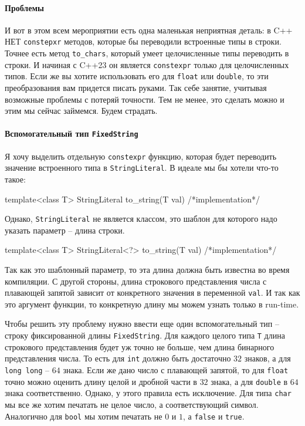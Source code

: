 \paragraph{Проблемы}

И вот в этом всем мероприятии есть одна маленькая неприятная деталь: в C++ НЕТ \verb"constepxr" методов, которые бы переводили встроенные типы в строки.
Точнее есть метод \verb"to_chars", который умеет целочисленные типы переводить в строки.
И начиная с C++23 он является \verb"constexpr" только для целочисленных типов.
Если же вы хотите использовать его для \verb"float" или \verb"double", то эти преобразования вам придется писать руками.
Так себе занятие, учитывая возможные проблемы с потеряй точности.
Тем не менее, это сделать можно и этим мы сейчас займемся.
Будем страдать.

\paragraph{Вспомогательный тип \texttt{FixedString}}

Я хочу выделить отдельную \verb"constexpr" функцию, которая будет переводить значение встроенного типа в \verb"StringLiteral".
В идеале мы бы хотели что-то такое:
\begin{cppcode}
template<class T>
StringLiteral to_string(T val) {
  /*implementation*/
}
\end{cppcode}
Однако, \verb"StringLiteral" не является классом, это шаблон для которого надо указать параметр -- длина строки.
\begin{cppcode}
template<class T>
StringLiteral<?> to_string(T val) {
  /*implementation*/
}
\end{cppcode}
Так как это шаблонный параметр, то эта длина должна быть известна во время компиляции.
С другой стороны, длина строкового представления числа с плавающей запятой зависит от конкретного значения в переменной \verb"val".
И так как это аргумент функции, то конкретную длину мы можем узнать только в run-time.

Чтобы решить эту проблему нужно ввести еще один вспомогательный тип -- строку фиксированной длины \verb"FixedString".
Для каждого целого типа \verb"T" длина строкового представления будет уж точно не больше, чем длина бинарного представления числа.
То есть для \verb"int" должно быть достаточно $32$ знаков, а для \verb"long long" -- $64$ знака.
Если же дано число с плавающей запятой, то для \verb"float" точно можно оценить длину целой и дробной части в $32$ знака, а для \verb"double" в $64$ знака соответственно. 
Однако, у этого правила есть исключение.
Для типа \verb"char" мы все же хотим печатать не целое число, а соответствующий символ.
Аналогично для \verb"bool" мы хотим печатать не $0$ и $1$, а \verb"false" и \verb"true".

